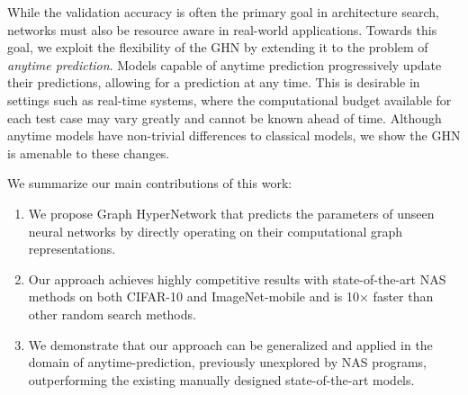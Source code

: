 While the validation accuracy is often the primary goal in architecture search, networks must also
be resource aware in real-world applications. Towards this goal, we exploit the flexibility of the
GHN by extending it to the problem of \textit{anytime prediction}. Models capable of anytime
prediction progressively update their predictions, allowing for a prediction at any time. This is
desirable in settings such as real-time systems, where the computational budget available for each
test case may vary greatly and cannot be known ahead of time. Although anytime models have
non-trivial differences to classical models, we show the GHN is amenable to these changes.
 
We summarize our main contributions of this work:
\vspace{-0.1cm}
\begin{enumerate}
\setlength{\itemsep}{1pt}
\item We propose Graph HyperNetwork that predicts the parameters of unseen neural networks by
directly operating on their computational graph representations.
\item Our approach achieves highly competitive results with state-of-the-art NAS methods on both
CIFAR-10 and ImageNet-mobile and is 10$\times$ faster than other random search methods.
\item We demonstrate that our approach can be generalized and applied in the domain of
anytime-prediction, previously unexplored by NAS programs, outperforming the existing manually
designed state-of-the-art models.
\end{enumerate}